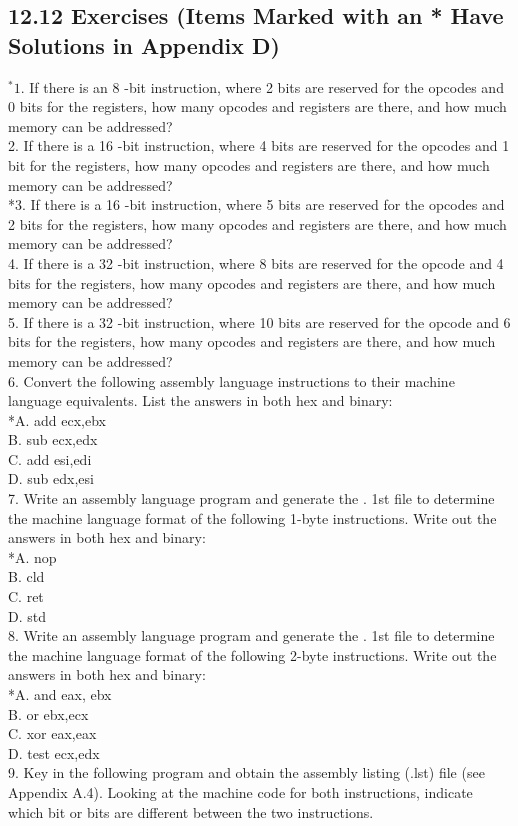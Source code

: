\documentclass[10pt]{article}
\begin{document}
\subsection*{12.12 Exercises (Items Marked with an * Have Solutions in Appendix D)}
${ }^{*} 1$. If there is an 8 -bit instruction, where 2 bits are reserved for the opcodes and 0 bits for the registers, how many opcodes and registers are there, and how much memory can be addressed?\\
2. If there is a 16 -bit instruction, where 4 bits are reserved for the opcodes and 1 bit for the registers, how many opcodes and registers are there, and how much memory can be addressed?\\
*3. If there is a 16 -bit instruction, where 5 bits are reserved for the opcodes and 2 bits for the registers, how many opcodes and registers are there, and how much memory can be addressed?\\
4. If there is a 32 -bit instruction, where 8 bits are reserved for the opcode and 4 bits for the registers, how many opcodes and registers are there, and how much memory can be addressed?\\
5. If there is a 32 -bit instruction, where 10 bits are reserved for the opcode and 6 bits for the registers, how many opcodes and registers are there, and how much memory can be addressed?\\
6. Convert the following assembly language instructions to their machine language equivalents. List the answers in both hex and binary:\\
*A. add ecx,ebx\\
B. sub ecx,edx\\
C. add esi,edi\\
D. sub edx,esi\\
7. Write an assembly language program and generate the . 1st file to determine the machine language format of the following 1-byte instructions. Write out the answers in both hex and binary:\\
*A. nop\\
B. cld\\
C. ret\\
D. std\\
8. Write an assembly language program and generate the . 1st file to determine the machine language format of the following 2-byte instructions. Write out the answers in both hex and binary:\\
*A. and eax, ebx\\
B. or ebx,ecx\\
C. xor eax,eax\\
D. test ecx,edx\\
9. Key in the following program and obtain the assembly listing (.lst) file (see Appendix A.4). Looking at the machine code for both instructions, indicate which bit or bits are different between the two instructions.
\end{document}
